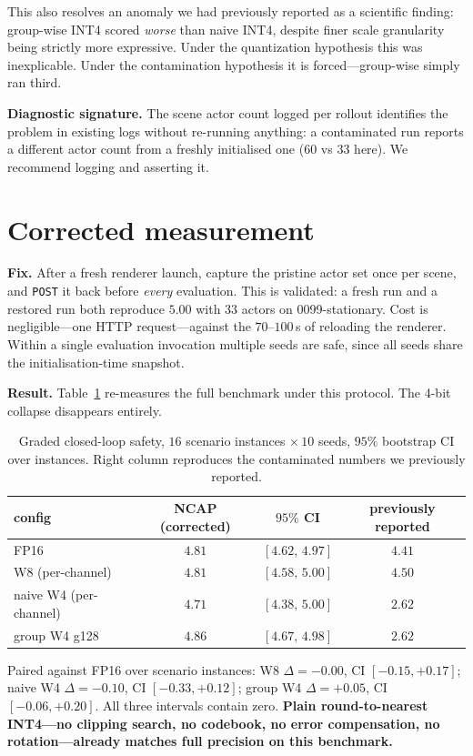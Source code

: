 \documentclass[conference]{IEEEtran}
\begin{document}
This also resolves an anomaly we had previously reported as a scientific finding: group-wise INT4
scored \emph{worse} than naive INT4, despite finer scale granularity being strictly more
expressive. Under the quantization hypothesis this was inexplicable. Under the contamination
hypothesis it is forced---group-wise simply ran third.

\textbf{Diagnostic signature.} The scene actor count logged per rollout identifies the problem in
existing logs without re-running anything: a contaminated run reports a different actor count from
a freshly initialised one ($60$ vs $33$ here). We recommend logging and asserting it.

\section{Corrected measurement}
\textbf{Fix.} After a fresh renderer launch, capture the pristine actor set once per scene, and
\texttt{POST} it back before \emph{every} evaluation. This is validated: a fresh run and a
restored run both reproduce $5.00$ with $33$ actors on 0099-stationary. Cost is negligible---one
HTTP request---against the $70$--$100$\,s of reloading the renderer. Within a single evaluation
invocation multiple seeds are safe, since all seeds share the initialisation-time snapshot.

\textbf{Result.} Table~\ref{tab:corrected} re-measures the full benchmark under this protocol.
The 4-bit collapse disappears entirely.

\begin{table}[t]\centering
\caption{Graded closed-loop safety, $16$ scenario instances $\times\,10$ seeds, $95\%$ bootstrap CI
over instances. Right column reproduces the contaminated numbers we previously reported.}
\label{tab:corrected}
\begin{tabular}{lccc}
\toprule
config & NCAP (corrected) & $95\%$ CI & previously reported \\
\midrule
FP16 & $4.81$ & $[4.62,\,4.97]$ & $4.41$ \\
W8 (per-channel) & $4.81$ & $[4.58,\,5.00]$ & $4.50$ \\
naive W4 (per-channel) & $\mathbf{4.71}$ & $[4.38,\,5.00]$ & $2.62$ \\
group W4 g128 & $\mathbf{4.86}$ & $[4.67,\,4.98]$ & $2.62$ \\
\bottomrule
\end{tabular}
\end{table}

Paired against FP16 over scenario instances: W8 $\Delta=-0.00$, CI $[-0.15,+0.17]$; naive W4
$\Delta=-0.10$, CI $[-0.33,+0.12]$; group W4 $\Delta=+0.05$, CI $[-0.06,+0.20]$. All three
intervals contain zero. \textbf{Plain round-to-nearest INT4---no clipping search, no codebook, no
error compensation, no rotation---already matches full precision on this benchmark.}
\end{document}
